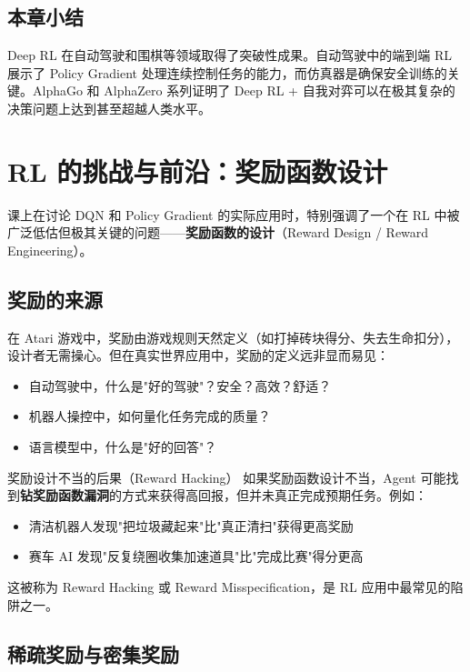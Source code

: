 \documentclass[a4paper]{article}
\begin{document}
\subsection{本章小结}

Deep RL 在自动驾驶和围棋等领域取得了突破性成果。自动驾驶中的端到端 RL 展示了 Policy Gradient 处理连续控制任务的能力，而仿真器是确保安全训练的关键。AlphaGo 和 AlphaZero 系列证明了 Deep RL + 自我对弈可以在极其复杂的决策问题上达到甚至超越人类水平。


\section{RL 的挑战与前沿：奖励函数设计}

课上在讨论 DQN 和 Policy Gradient 的实际应用时，特别强调了一个在 RL 中被广泛低估但极其关键的问题------\textbf{奖励函数的设计}（Reward Design / Reward Engineering）。

\subsection{奖励的来源}

在 Atari 游戏中，奖励由游戏规则天然定义（如打掉砖块得分、失去生命扣分），设计者无需操心。但在真实世界应用中，奖励的定义远非显而易见：

\begin{itemize}
    \item 自动驾驶中，什么是"好的驾驶"？安全？高效？舒适？
    \item 机器人操控中，如何量化任务完成的质量？
    \item 语言模型中，什么是"好的回答"？
\end{itemize}

\begin{warningbox}{奖励设计不当的后果（Reward Hacking）}
如果奖励函数设计不当，Agent 可能找到\textbf{钻奖励函数漏洞}的方式来获得高回报，但并未真正完成预期任务。例如：
\begin{itemize}
    \item 清洁机器人发现"把垃圾藏起来"比"真正清扫"获得更高奖励
    \item 赛车 AI 发现"反复绕圈收集加速道具"比"完成比赛"得分更高
\end{itemize}
这被称为 Reward Hacking 或 Reward Misspecification，是 RL 应用中最常见的陷阱之一。
\end{warningbox}

\subsection{稀疏奖励与密集奖励}
\end{document}
